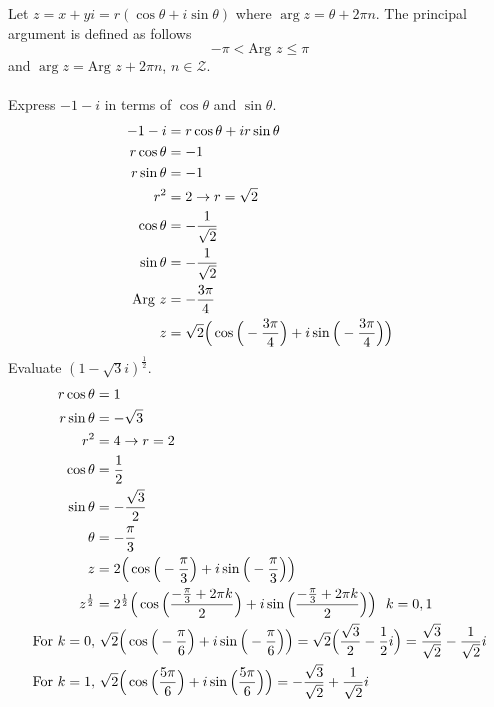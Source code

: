 \documentclass[12pt]{article}
\begin{document}
Let $z = x + yi = r(\cos \theta + i\sin\theta)$ where $\arg{z} = \theta + 2\pi n$. The principal argument is defined as follows $$-\pi < \text{Arg } z \leq \pi $$ and $\arg{z} = \text{Arg } z + 2\pi n$, $n \in \mathcal{Z}$. \\~\\
Express $-1-i$ in terms of $\cos \theta$ and $\sin\theta$. 
$$ \begin{aligned} -1 - i &= r\cos\theta + ir\sin\theta \\ r\cos\theta &= -1 \\ r\sin\theta &= -1 \\ r^2 &= 2 \to r = \sqrt{2} \\ \cos\theta &= -\frac{1}{\sqrt{2}} \\ \sin\theta &= -\frac{1}{\sqrt{2}} \\ \text{Arg } z &= -\frac{3\pi}{4} \\ z &= \sqrt{2}\Big(\cos\Big( -\frac{3\pi}{4} \Big) + i\sin\Big( -\frac{3\pi}{4} \Big)\Big) \end{aligned} $$ 
Evaluate $(1 - \sqrt{3}i)^{\frac{1}{2}}$. 
$$ \begin{aligned} r\cos\theta &= 1 \\ r\sin\theta &= -\sqrt{3} \\ r^2 &= 4 \to r = 2 \\ \cos\theta &= \frac{1}{2} \\ \sin\theta &= -\frac{\sqrt{3}}{2} \\ \theta &= -\frac{\pi}{3} \\ z &= 2\Big(\cos\Big( -\frac{\pi}{3} \Big) + i\sin\Big( -\frac{\pi}{3} \Big)\Big) \\ z^{\frac{1}{2}} &= 2^{\frac{1}{2}}\Big(\cos\Big( \frac{-\frac{\pi}{3} + 2\pi k}{2} \Big) + i\sin\Big( \frac{-\frac{\pi}{3} + 2\pi k}{2} \Big)\Big) ~~ k = 0,1 \\ \text{For } k = 0, &~ \sqrt{2}\Big(\cos\Big( -\frac{\pi}{6} \Big) + i\sin\Big( -\frac{\pi}{6} \Big)\Big) = \sqrt{2}\Big( \frac{\sqrt{3}}{2} - \frac{1}{2}i\Big) = \frac{\sqrt{3}}{\sqrt{2}} - \frac{1}{\sqrt{2}}i \\ \text{For } k = 1, &~ \sqrt{2}\Big(\cos\Big( \frac{5\pi}{6} \Big) + i\sin\Big( \frac{5\pi}{6} \Big)\Big) = -\frac{\sqrt{3}}{\sqrt{2}} + \frac{1}{\sqrt{2}}i \end{aligned} $$ 
\end{document}
